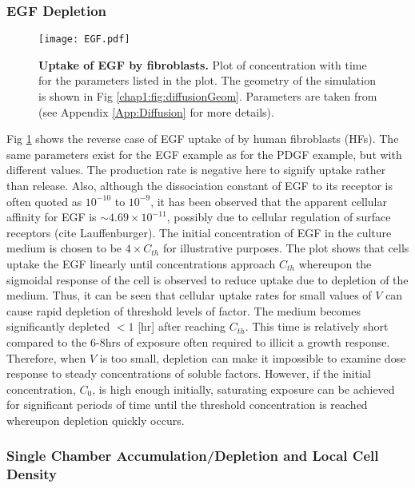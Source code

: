 \subsubsection{EGF Depletion}

\begin{figure}[!b]
\centering
\texttt{[image: EGF.pdf]}
\caption{\textbf{Uptake of EGF by fibroblasts.} Plot of concentration with time for the parameters listed in the plot. The geometry of the simulation is shown in Fig \ref{chap1:fig:diffusionGeom}. Parameters are taken from \cite{KNAUER:1984fj,STARBUCK:1992kl} (see Appendix \ref{App:Diffusion} for more details).}
\label{chap1:fig:EGF}
\end{figure}

Fig \ref{chap1:fig:EGF} shows the reverse case of EGF uptake of by human fibroblasts (HFs). The same parameters exist for the EGF example as for the PDGF example, but with different values. The production rate is negative here to signify uptake rather than release. Also, although the dissociation constant of EGF to its receptor is often quoted as $10^{-10}$ to $10^{-9}$, it has been observed that the apparent cellular affinity for EGF is $\sim 4.69 \times 10^{-11}$, possibly due to cellular regulation of surface receptors (cite Lauffenburger). The initial concentration of EGF in the culture medium is chosen to be $4 \times C_{th}$ for illustrative purposes. The plot shows that cells uptake the EGF linearly until concentrations approach $C_{th}$ whereupon the sigmoidal response of the cell is observed to reduce uptake due to depletion of the medium. Thus, it can be seen that cellular uptake rates for small values of $V$ can cause rapid depletion of threshold levels of factor. The medium becomes significantly depleted $< 1$ [hr] after reaching $C_{th}$. This time is relatively short compared to the 6-8hrs of exposure often required to illicit a growth response. Therefore, when $V$ is too small, depletion can make it impossible to examine dose response to steady concentrations of soluble factors. However, if the initial concentration, $C_{0}$, is high enough initially, saturating exposure can be achieved for significant periods of time until the threshold concentration is reached whereupon depletion quickly occurs.

\subsubsection{Single Chamber Accumulation/Depletion and Local Cell Density}
\label{SubSubSection:LocalGradients}

